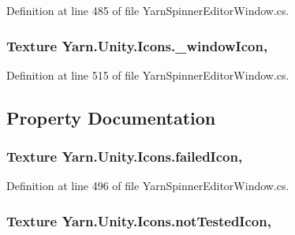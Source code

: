 Definition at line 485 of file Yarn\-Spinner\-Editor\-Window.\-cs.

\hypertarget{a00106_abba8fef6cc12836ea431a8a7c9e2f3db}{
\subsubsection[{\-\_\-window\-Icon}]{\setlength{\rightskip}{0pt plus 5cm}Texture Yarn.\-Unity.\-Icons.\-\_\-window\-Icon\hspace{0.3cm}{\ttfamily [static]}, {\ttfamily [private]}}}\label{a00106_abba8fef6cc12836ea431a8a7c9e2f3db}


Definition at line 515 of file Yarn\-Spinner\-Editor\-Window.\-cs.



\subsection{Property Documentation}
\hypertarget{a00106_aae7cc0e5016db04a90b2aa0e80957626}{
\subsubsection[{failed\-Icon}]{\setlength{\rightskip}{0pt plus 5cm}Texture Yarn.\-Unity.\-Icons.\-failed\-Icon\hspace{0.3cm}{\ttfamily [static]}, {\ttfamily [get]}}}\label{a00106_aae7cc0e5016db04a90b2aa0e80957626}


Definition at line 496 of file Yarn\-Spinner\-Editor\-Window.\-cs.

\hypertarget{a00106_ab8afce565cd2ad1543d1e32e7e589e77}{
\subsubsection[{not\-Tested\-Icon}]{\setlength{\rightskip}{0pt plus 5cm}Texture Yarn.\-Unity.\-Icons.\-not\-Tested\-Icon\hspace{0.3cm}{\ttfamily [static]}, {\ttfamily [get]}}}\label{a00106_ab8afce565cd2ad1543d1e32e7e589e77}


